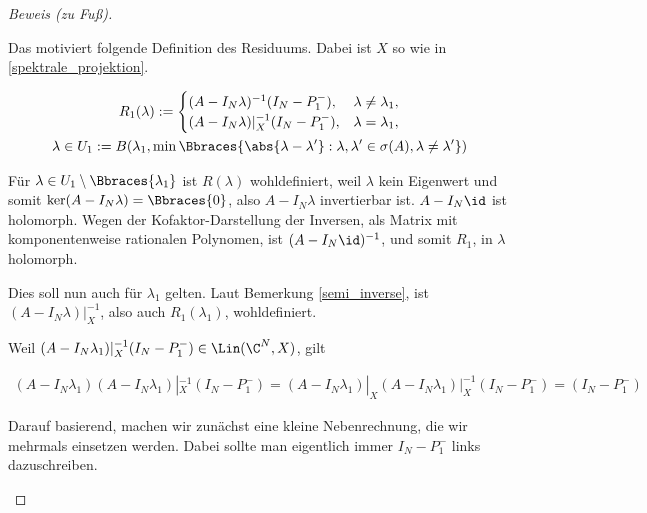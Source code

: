 \begin{proof}[Beweis (zu Fuß)]
\begin{enumerate}[label = (\roman*)]
        Das motiviert folgende Definition des Residuums.
        Dabei ist $X$ so wie in \ref{spektrale_projektion}.

        \begin{multline*}
            R_1(\lambda)
            :=
            \begin{cases}
                (A - I_N \lambda)    ^{-1} (I_N - P_1^-), & \lambda \neq \lambda_1, \\
                (A - I_N \lambda) |_X^{-1} (I_N - P_1^-), & \lambda =    \lambda_1, \\
            \end{cases} \\
            \lambda
            \in
            U_1
            :=
            B
            (
                \lambda_1,
                \min
                \Bbraces
                {
                    \abs{\lambda - \lambda^\prime}:
                    \lambda, \lambda^\prime \in \sigma(A),
                    \lambda \neq \lambda^\prime
                }
            )
        \end{multline*}

        Für $\lambda \in U_1 \setminus \Bbraces{\lambda_1}$ ist $R(\lambda)$ wohldefiniert, weil $\lambda$ kein Eigenwert und somit $\ker (A - I_N \lambda) = \Bbraces{0}$, also $A - I_N \lambda$ invertierbar ist.
        $A - I_N \id$ ist holomorph.
        Wegen der Kofaktor-Darstellung der Inversen, als Matrix mit komponentenweise rationalen Polynomen, ist $(A - I_N \id)^{-1}$, und somit $R_1$, in $\lambda$ holomorph.

        Dies soll nun auch für $\lambda_1$ gelten.
        Laut Bemerkung \ref{semi_inverse}, ist $(A - I_N \lambda) |_X^{-1}$, also auch $R_1(\lambda_1)$, wohldefiniert.

        Weil $(A - I_N \lambda_1) |_X^{-1} (I_N - P_1^-) \in \Lin(\C^N, X)$, gilt

        \begin{align*}
            (A - I_N \lambda_1)
            (A - I_N \lambda_1) |_X^{-1}
            (I_N - P_1^-)
            =
            (A - I_N \lambda_1) |_X
            (A - I_N \lambda_1) |_X^{-1}
            (I_N - P_1^-)
            =
            (I_N - P_1^-)
        \end{align*}

        Darauf basierend, machen wir zunächst eine kleine Nebenrechnung, die wir mehrmals einsetzen werden.
        Dabei sollte man eigentlich immer $I_N - P_1^-$ links dazuschreiben.


\end{enumerate}
\end{proof}
